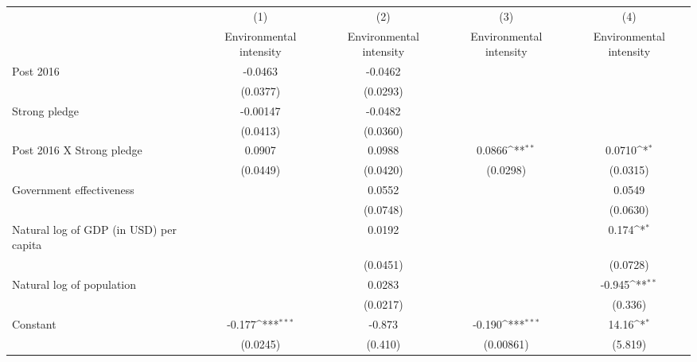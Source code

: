 {
\def\sym#1{\ifmmode^{#1}\else\(^{#1}\)\fi}
\begin{tabular}{l*{4}{c}}
\hline\hline
                    &\multicolumn{1}{c}{(1)}&\multicolumn{1}{c}{(2)}&\multicolumn{1}{c}{(3)}&\multicolumn{1}{c}{(4)}\\
                    &\multicolumn{1}{c}{Environmental intensity}&\multicolumn{1}{c}{Environmental intensity}&\multicolumn{1}{c}{Environmental intensity}&\multicolumn{1}{c}{Environmental intensity}\\
\hline
Post 2016           &     -0.0463         &     -0.0462         &                     &                     \\
                    &    (0.0377)         &    (0.0293)         &                     &                     \\
[1em]
Strong pledge       &    -0.00147         &     -0.0482         &                     &                     \\
                    &    (0.0413)         &    (0.0360)         &                     &                     \\
[1em]
Post 2016 X Strong pledge&      0.0907         &      0.0988         &      0.0866\sym{**} &      0.0710\sym{*}  \\
                    &    (0.0449)         &    (0.0420)         &    (0.0298)         &    (0.0315)         \\
[1em]
Government effectiveness&                     &      0.0552         &                     &      0.0549         \\
                    &                     &    (0.0748)         &                     &    (0.0630)         \\
[1em]
Natural log of GDP (in USD) per capita&                     &      0.0192         &                     &       0.174\sym{*}  \\
                    &                     &    (0.0451)         &                     &    (0.0728)         \\
[1em]
Natural log of population&                     &      0.0283         &                     &      -0.945\sym{**} \\
                    &                     &    (0.0217)         &                     &     (0.336)         \\
[1em]
Constant            &      -0.177\sym{***}&      -0.873         &      -0.190\sym{***}&       14.16\sym{*}  \\
                    &    (0.0245)         &     (0.410)         &   (0.00861)         &     (5.819)         \\

\end{tabular}}
